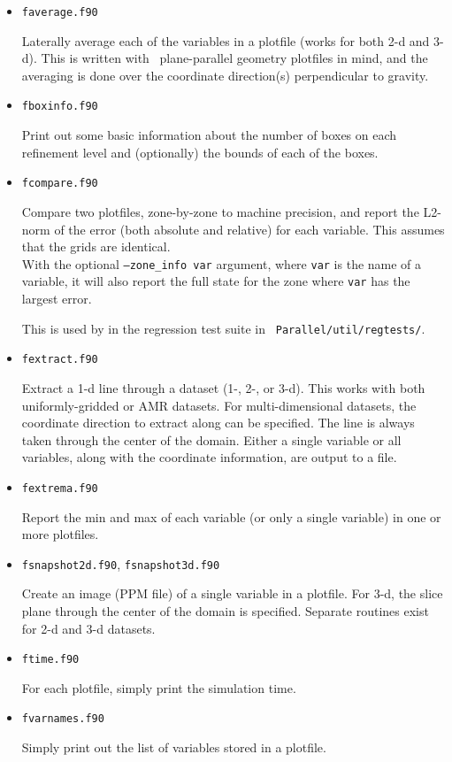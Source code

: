 \begin{itemize}

\item {\tt faverage.f90}

  Laterally average each of the variables in a plotfile (works for
  both 2-d and 3-d).  This is written with \maestro\
  plane-parallel geometry plotfiles in mind, and the averaging is done
  over the coordinate direction(s) perpendicular to gravity.


\item {\tt fboxinfo.f90}

  Print out some basic information about the number of boxes on each
  refinement level and (optionally) the bounds of each of the boxes.

\item {\tt fcompare.f90}

  Compare two plotfiles, zone-by-zone to machine precision, and report
  the L2-norm of the error (both absolute and relative) for each
  variable.  This assumes that the grids are identical. \\[-3mm]
 
  With the optional {\tt --zone\_info var} argument, where {\tt var}
  is the name of a variable, it will also report the full state
  for the zone where {\tt var} has the largest error.

  This is used by in the regression test suite in {\tt
  Parallel/util/regtests/}.


\item {\tt fextract.f90}

  Extract a 1-d line through a dataset (1-, 2-, or 3-d).  This works
  with both uniformly-gridded or AMR datasets.  For multi-dimensional
  datasets, the coordinate direction to extract along can be specified.
  The line is always taken through the center of the domain.  Either
  a single variable or all variables, along with the coordinate 
  information, are output to a file.
  

\item {\tt fextrema.f90}

  Report the min and max of each variable (or only a single variable)
  in one or more plotfiles.


\item {\tt fsnapshot2d.f90}, {\tt fsnapshot3d.f90}

  Create an image (PPM file) of a single variable in a plotfile.  For
  3-d, the slice plane through the center of the domain is specified.
  Separate routines exist for 2-d and 3-d datasets.
  

\item {\tt ftime.f90}
 
  For each plotfile, simply print the simulation time.


\item {\tt fvarnames.f90}

  Simply print out the list of variables stored in a plotfile.


\end{itemize}

